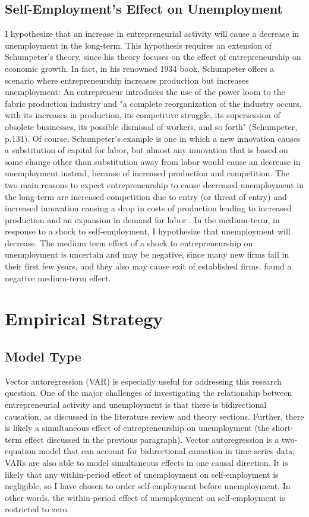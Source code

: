 \documentclass[]{ecca}
\begin{document}
\subsection{Self-Employment's Effect on Unemployment}
I hypothesize that an increase in entrepreneurial activity will cause a decrease in unemployment in the long-term. This hypothesis requires an extension of Schumpeter's theory, since his theory focuses on the effect of entrepreneurship on economic growth. In fact, in his renowned 1934 book, Schumpeter offers a scenario where entrepreneurship increases production but increases unemployment: An entrepreneur introduces the use of the power loom to the fabric production industry and "a complete reorganization of the industry occurs, with its increases in production, its competitive struggle, its supersession of obsolete businesses, its possible dismissal of workers, and so forth" (Schumpeter, p.131). Of course, Schumpeter's example is one in which a new innovation causes a substitution of capital for labor, but almost any innovation that is based on some change other than substitution away from labor would cause an decrease in unemployment instead, because of increased production and competition. The two main reasons to expect entrepreneurship to cause decreased unemployment in the long-term are increased competition due to entry (or threat of entry) and increased innovation causing a drop in costs of production leading to increased production and an expansion in demand for labor \citep{fritsch04}. In the medium-term, in response to a shock to self-employment, I hypothesize that unemployment will decrease. The medium term effect of a shock to entrepreneurship on unemployment is uncertain and may be negative, since many new firms fail in their first few years, and they also may cause exit of established firms. \citep{fritsch04} found a negative medium-term effect.

\section{Empirical Strategy}
\subsection{Model Type}
	
Vector autoregression (VAR) is especially useful for addressing this research question. One of the major challenges of investigating the relationship between entrepreneurial activity and unemployment is that there is bidirectional causation, as discussed in the literature review and theory sections. Further, there is likely a simultaneous effect of entrepreneurship on unemployment (the short-term effect discussed in the previous paragraph). Vector autoregression is a two-equation model that can account for bidirectional causation in time-series data; VARs are also able to model simultaneous effects in one causal direction. It is likely that any within-period effect of unemployment on self-employment is negligible, so I have chosen to order self-employment before unemployment. In other words, the within-period effect of unemployment on self-employment is restricted to zero.
\end{document}
